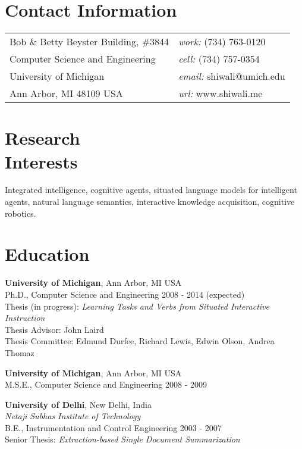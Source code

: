 \documentclass[margin,line,11pt]{res}
\begin{document}

\thispagestyle{empty}
\begin{resume}
\section{\sc Contact Information}
\vspace{.05in}
\begin{tabular}{@{}p{3in}p{4in}}
Bob \& Betty Beyster Building, \#3844             & {\it work:}  (734) 763-0120 \\            
Computer Science and Engineering                  & {\it cell:}    (734) 757-0354 \\         
University of Michigan                            & {\it email:}  shiwali@umich.edu\\       
Ann Arbor, MI  48109 USA                          & {\it url:} www.shiwali.me \\     
\end{tabular}


\section{\sc Research \\Interests}
Integrated intelligence, cognitive agents, situated language models
for intelligent agents, natural language semantics, interactive
knowledge acquisition, cognitive robotics.

\section{\sc Education}
{\bf University of Michigan}, Ann Arbor, MI USA\\
Ph.D., Computer Science and Engineering \hfill 2008 - 2014 (expected)\\
Thesis (in progress):  \emph{Learning Tasks and Verbs from Situated Interactive Instruction} \\
Thesis Advisor:  John Laird \\
Thesis Committee: Edmund Durfee, Richard Lewis, Edwin Olson, Andrea Thomaz

{\bf University of Michigan}, Ann Arbor, MI USA\\
M.S.E., Computer Science and Engineering \hfill 2008 - 2009

{\bf University of Delhi}, New Delhi, India\\
{\em Netaji Subhas Institute of Technology}\\
B.E.,  Instrumentation and Control Engineering \hfill 2003 - 2007\\ 
Senior Thesis: \emph{Extraction-based Single Document Summarization}




\end{resume}
\end{document}
